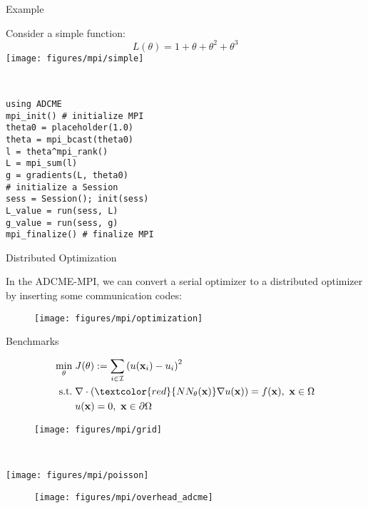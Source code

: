 \documentclass[usenames,dvipsnames]{beamer}
\newcommand{\bx}{\mathbf{x}}
\begin{document}
\begin{frame}[fragile]{Example}

\begin{minipage}{.5\textwidth}
	Consider a simple function:
	$$L(\theta) = 1 + \theta + \theta^2 + \theta^3$$
		\texttt{[image: figures/mpi/simple]}
\end{minipage}~
\begin{minipage}{.5\textwidth}
	\begin{verbatim}
using ADCME
mpi_init() # initialize MPI 
theta0 = placeholder(1.0)
theta = mpi_bcast(theta0)
l = theta^mpi_rank()
L = mpi_sum(l)
g = gradients(L, theta0)
# initialize a Session
sess = Session(); init(sess)
L_value = run(sess, L) 
g_value = run(sess, g)
mpi_finalize() # finalize MPI 
	\end{verbatim}
\end{minipage}


\end{frame}


\begin{frame}{Distributed Optimization}
	
	In the ADCME-MPI, we can convert a serial optimizer to a distributed optimizer by inserting some communication codes:
\begin{figure}
\centering 
\texttt{[image: figures/mpi/optimization]}
\end{figure}
\end{frame}

\begin{frame}{Benchmarks}
	\begin{minipage}[c]{.52\textwidth}
		\begin{equation*}
			\begin{aligned}
				\min_{\theta}&\; J(\theta):=\sum_{i\in \mathcal{I}} \left( u(\bx_i) - u_i \right)^2\\ 
				\text{s.t.} &\; \nabla \cdot (\textcolor{red}{NN_\theta(\bx)} \nabla u(\bx))  = f(\bx),\ \bx \in \Omega \\ 
				&\; u(\bx) = 0,\  \bx \in \partial \Omega
			\end{aligned}
		\end{equation*}
	\begin{figure}
		\centering
			\texttt{[image: figures/mpi/grid]}
	\end{figure}

	\end{minipage}~
	\begin{minipage}[c]{.48\textwidth}
		\texttt{[image: figures/mpi/poisson]}
	\end{minipage}
	
	
\end{frame}
\begin{frame}
	\begin{figure}[htpb]
		\centering 		
		\texttt{[image: figures/mpi/overhead\_adcme]}
	\end{figure}
\end{frame}
\end{document}
